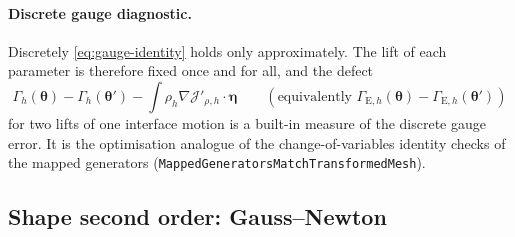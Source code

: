 \documentclass[11pt]{article}
\newcommand{\Jf}{\mathscr{J}}  %
\newcommand{\bfeta}{\bm{\eta}}
\begin{document}
\paragraph{Discrete gauge diagnostic.} Discretely
\eqref{eq:gauge-identity} holds only approximately. The lift of each
parameter is therefore fixed once and for all, and the defect
\begin{equation}
  \Gamma_h(\bm{\theta}) - \Gamma_h(\bm{\theta}')
  - \int\rho_h\nabla \Jf'_{\rho,h}\cdot\bfeta
  \qquad(\text{equivalently } \Gamma_{\mathrm{E},h}(\bm{\theta}) -
  \Gamma_{\mathrm{E},h}(\bm{\theta}'))
\end{equation}
for two lifts of one interface motion is a built-in measure of the
discrete gauge error. It is the optimisation analogue of the
change-of-variables identity checks of the mapped generators
(\texttt{MappedGeneratorsMatchTransformedMesh}).

\subsection{Shape second order: Gauss--Newton}
\end{document}
